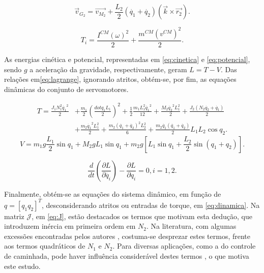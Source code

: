 \begin{equation}
\label{eq:vg2}
\vec{v}_{G_2} = \vec{v_{M_2}}+\frac{L_2}{2}(\dot{q_1}+\dot{q_2})(\vec{k} \times \vec{r_2}).
\end{equation}

\begin{equation}
\label{eq:encinqqer}
T_i = \frac{I^{CM} (\omega)^2}{2} + \frac{m^{CM} (v^{CM})^2}{2}.
\end{equation}

As energias cinética e potencial, representadas em \eqref{eq:cinetica} e \eqref{eq:potencial}, sendo $g$ a aceleração da gravidade, respectivamente, geram $L = T-V$. Das relações em\eqref{eq:lagrange}, ignorando atritos, obtém-se, por fim, as equações dinâmicas do conjunto de servomotores.

\begin{equation}
\begin{aligned}
\label{eq:cinetica}
T = \frac{J_1 N_1^2 \dot{q_1}^2}{2} &+ \frac{m_1}{2}\left(\frac{dot{q_1}L_1}{2}\right)^2+\frac{1}{2}\frac{m_1 L_1^2 \dot{q_1}^2}{12}+\frac{M_2 \dot{q_2}^2 L_1^2}{2}+\frac{J_2(N_2 \dot{q_2}+\dot{q_1})}{2}\\ &+\frac{m_2 \dot{q_1}^2 L_1^2}{2} + \frac{m_2 (\dot{q_1}+\dot{q_2})^2 L_2^2}{6} + \frac{m_2 \dot{q_1}(\dot{q_1}+\dot{q_2})}{2}L_1 L_2 \cos q_2.
\end{aligned}
\end{equation}
\begin{equation}
\label{eq:potencial}
V = m_1 g \frac{L_1}{2} \sin q_1 + M_2 g L_1 \sin q_1 + m_2 g \left[L_1 \sin q_1 + \frac{L_2}{2} \sin (q_1 + q_2)\right].
\end{equation}

\begin{equation}
\label{eq:lagrange}
\frac{d}{d t}\left(\frac{\partial L}{\partial \dot{q_i}} \right) - \frac{\partial L}{\partial q_i} = 0, i = 1,2.
\end{equation}

Finalmente, obtém-se as equações do sistema dinâmico, em função de $q = [q_1 q_2]^T$, desconsiderando atritos ou entradas de torque, em \eqref{eq:dinamica}. Na matriz $\mathcal{J}$, em \eqref{eq:J}, estão destacados os termos que motivam esta dedução, que introduzem inércia em primeira ordem em $N_2$. Na literatura, com algumas excessões encontradas pelos autores \cite{siciliano,nasareport}, costuma-se desprezar estes termos, frente aos termos quadráticos de $N_1$ e $N_2$. Para diversas aplicações, como a do controle de caminhada, pode haver influência considerável destes termos \cite{nasareport}, o que motiva este estudo. 


